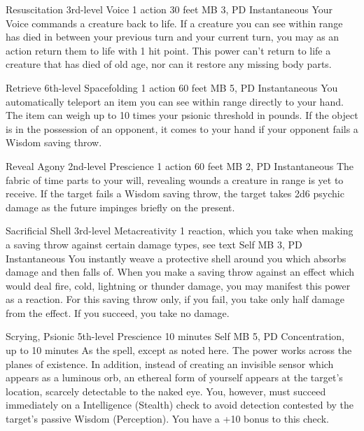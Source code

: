 \DndPowerHeader%
  {Resuscitation}
  {3rd-level Voice}
  {1 action}
  {30 feet}
  {MB 3, PD \lvlthree}
  {Instantaneous}
Your Voice commands a creature back to life.
If a creature you can see within range
has died in between your previous turn
and your current turn,
you may as an action return them to life
with 1 hit point.
This power can't return to life a creature
that has died of old age,
nor can it restore any missing body parts.

\DndPowerHeader%
  {Retrieve}
  {6th-level Spacefolding}
  {1 action}
  {60 feet}
  {MB 5, PD \lvlsix}
  {Instantaneous}
  You automatically teleport an item you can see within range
  directly to your hand.
  The item can weigh up to
  10 times your psionic threshold in pounds.
  If the object is in the possession of an opponent,
  it comes to your hand if your opponent
  fails a Wisdom saving throw.

\DndPowerHeader%
  {Reveal Agony}
  {2nd-level Prescience}
  {1 action}
  {60 feet}
  {MB 2, PD \lvltwo}
  {Instantaneous}
  The fabric of time parts to your will,
  revealing wounds a creature in range is yet to receive.
  If the target fails a Wisdom saving throw,
  the target takes 2d6 psychic damage as the future
  impinges briefly on the present.

\DndPowerHeader%
  {Sacrificial Shell}
  {3rd-level Metacreativity}
  {1 reaction, which you take when making a saving throw
    against certain damage types, see text}
  {Self}
  {MB 3, PD \lvlthree}
  {Instantaneous}
You instantly weave a protective shell around you
which absorbs damage and then falls of.
When you make a saving throw against an effect
which would deal fire, cold, lightning or thunder damage,
you may manifest this power as a reaction.
For this saving throw only,
if you fail, you take only half damage from the effect.
If you succeed, you take no damage.

\DndPowerHeader%
  {Scrying, Psionic}
  {5th-level Prescience}
  {10 minutes}
  {Self}
  {MB 5, PD \lvlfive}
  {Concentration, up to 10 minutes}
As the  spell, except as noted here.
The power works across the planes of existence.
In addition,
instead of creating an invisible sensor which appears
as a luminous orb,
an ethereal form of yourself appears at the target's location,
scarcely detectable to the naked eye.
You,
however,
must succeed immediately on a Intelligence (Stealth) check
to avoid detection contested by the target's passive
Wisdom (Perception).
You have a +10 bonus to this check.

